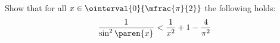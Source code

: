 Show that for all $x \in \ointerval{0}{\mfrac{\pi}{2}}$ the following holds:
\begin{equation*}
  \frac{1}{\sin^2\paren{x}}
  < \frac{1}{x^2} + 1 - \frac{4}{\pi^2}
\end{equation*}
